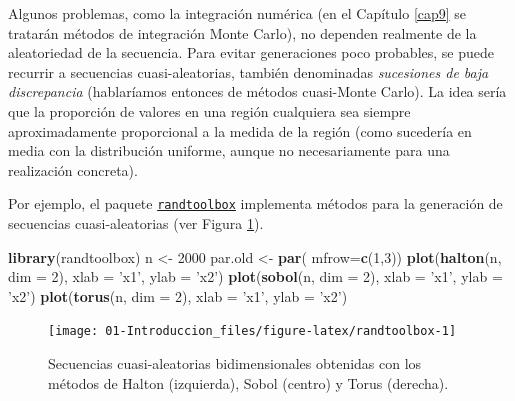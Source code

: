 \documentclass[
]{book}
\newenvironment{Shaded}{\begin{snugshade}}{\end{snugshade}}
\newcommand{\DataTypeTok}[1]{\textcolor[rgb]{0.13,0.29,0.53}{#1}}
\newcommand{\DecValTok}[1]{\textcolor[rgb]{0.00,0.00,0.81}{#1}}
\newcommand{\KeywordTok}[1]{\textcolor[rgb]{0.13,0.29,0.53}{\textbf{#1}}}
\newcommand{\NormalTok}[1]{#1}
\newcommand{\StringTok}[1]{\textcolor[rgb]{0.31,0.60,0.02}{#1}}
\theoremstyle{break}
\theoremstyle{definition}
\theoremstyle{definition}
\theoremstyle{definition}
\theoremstyle{remark}
\begin{document}
Algunos problemas, como la integración numérica (en el Capítulo \ref{cap9} se tratarán métodos de integración Monte Carlo), no dependen realmente de la aleatoriedad de la secuencia. Para evitar generaciones poco probables, se puede recurrir a secuencias cuasi-aleatorias, también denominadas \emph{sucesiones de baja discrepancia} (hablaríamos entonces de métodos cuasi-Monte Carlo). La idea sería que la proporción de valores en una región cualquiera sea siempre aproximadamente proporcional a la medida de la región (como sucedería en media con la distribución uniforme, aunque no necesariamente para una realización concreta).

Por ejemplo, el paquete \href{https://CRAN.R-project.org/package=randtoolbox}{\texttt{randtoolbox}} implementa métodos para la generación de secuencias cuasi-aleatorias (ver Figura \ref{fig:randtoolbox}).

\begin{Shaded}
\begin{Highlighting}[]
\KeywordTok{library}\NormalTok{(randtoolbox)}
\NormalTok{n <-}\StringTok{ }\DecValTok{2000}
\NormalTok{par.old <-}\StringTok{ }\KeywordTok{par}\NormalTok{( }\DataTypeTok{mfrow=}\KeywordTok{c}\NormalTok{(}\DecValTok{1}\NormalTok{,}\DecValTok{3}\NormalTok{))}
\KeywordTok{plot}\NormalTok{(}\KeywordTok{halton}\NormalTok{(n, }\DataTypeTok{dim =} \DecValTok{2}\NormalTok{), }\DataTypeTok{xlab =} \StringTok{'x1'}\NormalTok{, }\DataTypeTok{ylab =} \StringTok{'x2'}\NormalTok{)}
\KeywordTok{plot}\NormalTok{(}\KeywordTok{sobol}\NormalTok{(n, }\DataTypeTok{dim =} \DecValTok{2}\NormalTok{), }\DataTypeTok{xlab =} \StringTok{'x1'}\NormalTok{, }\DataTypeTok{ylab =} \StringTok{'x2'}\NormalTok{)}
\KeywordTok{plot}\NormalTok{(}\KeywordTok{torus}\NormalTok{(n, }\DataTypeTok{dim =} \DecValTok{2}\NormalTok{), }\DataTypeTok{xlab =} \StringTok{'x1'}\NormalTok{, }\DataTypeTok{ylab =} \StringTok{'x2'}\NormalTok{)}
\end{Highlighting}
\end{Shaded}

\begin{figure}[!htb]

{\centering \texttt{[image: 01-Introduccion\_files/figure-latex/randtoolbox-1]} 

}

\caption{Secuencias cuasi-aleatorias bidimensionales obtenidas con los métodos de Halton (izquierda), Sobol (centro) y Torus (derecha).}\label{fig:randtoolbox}
\end{figure}
\end{document}

